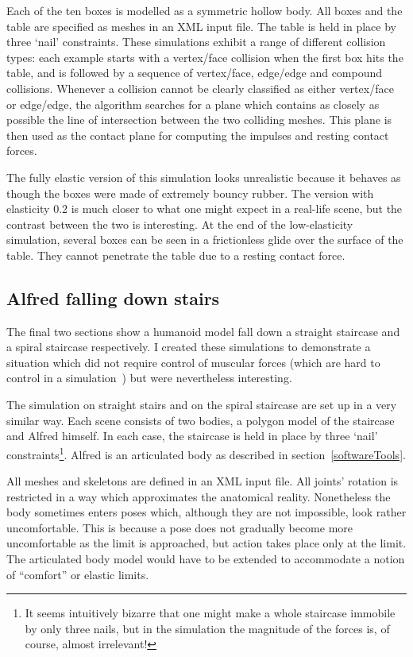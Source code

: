 Each of the ten boxes is modelled as a symmetric hollow body. All boxes and the table are
specified as meshes in an XML input file. The table is held in place by three `nail' constraints.
These simulations exhibit a range of different collision types: each example starts with a
vertex/face collision when the first box hits the table, and is followed by a sequence of
vertex/face, edge/edge and compound collisions. Whenever a collision cannot be clearly classified
as either vertex/face or edge/edge, the algorithm searches for a plane which contains as closely
as possible the line of intersection between the two colliding meshes. This plane is then used as
the contact plane for computing the impulses and resting contact forces.

The fully elastic version of this simulation looks unrealistic because it behaves as though the
boxes were made of extremely bouncy rubber. The version with elasticity 0.2 is much closer to what
one might expect in a real-life scene, but the contrast between the two is interesting. At the
end of the low-elasticity simulation, several boxes can be seen in a frictionless glide over the
surface of the table. They cannot penetrate the table due to a resting contact force.

\subsection{Alfred falling down stairs}

The final two sections show a humanoid model fall down a straight staircase and a spiral staircase
respectively. I created these simulations to demonstrate a situation which did not require control
of muscular forces (which are hard to control in a simulation~\cite{Green:91}) but were
nevertheless interesting.

The simulation on straight stairs and on the spiral staircase are set up in a very similar way.
Each scene consists of two bodies, a polygon model of the staircase and Alfred himself. In each
case, the staircase is held in place by three `nail' constraints\footnote{It seems intuitively
bizarre that one might make a whole staircase immobile by only three nails, but in the simulation
the magnitude of the forces is, of course, almost irrelevant!}. Alfred is an articulated body
as described in section~\ref{softwareTools}.

All meshes and skeletons are defined in an XML input file. All joints' rotation is restricted in
a way which approximates the anatomical reality. Nonetheless the body sometimes enters poses which,
although they are not impossible, look rather uncomfortable. This is because a pose does not
gradually become more uncomfortable as the limit is approached, but action takes place only at
the limit. The articulated body model would have to be extended to accommodate a notion of
``comfort'' or elastic limits.


